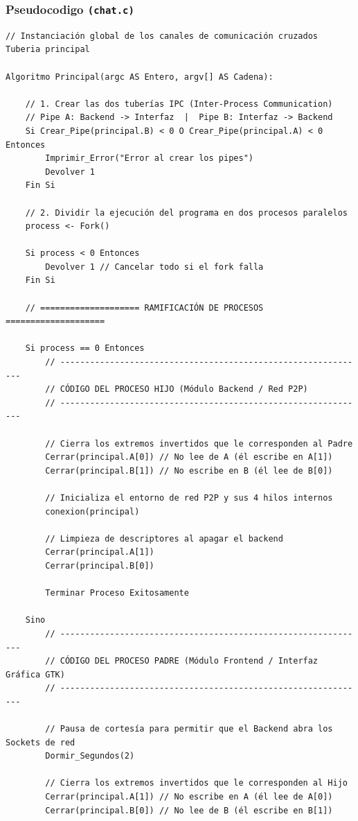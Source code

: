 \subsubsection{\large Pseudocodigo \texttt{(chat.c)}}
\begin{lstlisting}[style=estiloPseudo]
// Instanciación global de los canales de comunicación cruzados
Tuberia principal

Algoritmo Principal(argc AS Entero, argv[] AS Cadena):
    
    // 1. Crear las dos tuberías IPC (Inter-Process Communication)
    // Pipe A: Backend -> Interfaz  |  Pipe B: Interfaz -> Backend
    Si Crear_Pipe(principal.B) < 0 O Crear_Pipe(principal.A) < 0 Entonces
        Imprimir_Error("Error al crear los pipes")
        Devolver 1
    Fin Si

    // 2. Dividir la ejecución del programa en dos procesos paralelos
    process <- Fork()
    
    Si process < 0 Entonces
        Devolver 1 // Cancelar todo si el fork falla
    Fin Si

    // ==================== RAMIFICACIÓN DE PROCESOS ====================

    Si process == 0 Entonces
        // --------------------------------------------------------------
        // CÓDIGO DEL PROCESO HIJO (Módulo Backend / Red P2P)
        // --------------------------------------------------------------
        
        // Cierra los extremos invertidos que le corresponden al Padre
        Cerrar(principal.A[0]) // No lee de A (él escribe en A[1])
        Cerrar(principal.B[1]) // No escribe en B (él lee de B[0])

        // Inicializa el entorno de red P2P y sus 4 hilos internos
        conexion(principal)

        // Limpieza de descriptores al apagar el backend
        Cerrar(principal.A[1])
        Cerrar(principal.B[0])

        Terminar Proceso Exitosamente
        
    Sino
        // --------------------------------------------------------------
        // CÓDIGO DEL PROCESO PADRE (Módulo Frontend / Interfaz Gráfica GTK)
        // --------------------------------------------------------------
        
        // Pausa de cortesía para permitir que el Backend abra los Sockets de red
        Dormir_Segundos(2)

        // Cierra los extremos invertidos que le corresponden al Hijo
        Cerrar(principal.A[1]) // No escribe en A (él lee de A[0])
        Cerrar(principal.B[0]) // No lee de B (él escribe en B[1])


\end{lstlisting}
